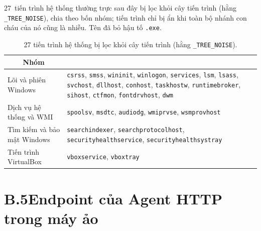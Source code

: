 \documentclass[../DoAn.tex]{subfiles}
\begin{document}
27~tiến trình hệ thống thường trực sau đây bị lọc khỏi cây tiến
trình (hằng \texttt{\_TREE\_NOISE}), chia theo bốn nhóm; tiến trình
chỉ bị ẩn khi toàn bộ nhánh con cháu của nó cũng là nhiễu. Tên đã
bỏ hậu tố \texttt{.exe}.
\begin{table}[H]
\centering
\caption{27 tiến trình hệ thống bị lọc khỏi cây tiến trình
  (hằng \texttt{\_TREE\_NOISE}).}
\label{tab:tree-noise}
\begin{tabular}{|l|>{\raggedright\arraybackslash}p{8.5cm}|}
\hline
\multicolumn{1}{|c|}{\textbf{Nhóm}} & \multicolumn{1}{c|}{\textbf{Tiến trình}} \\
\hline
Lõi và phiên Windows &
  \texttt{csrss}, \texttt{smss}, \texttt{wininit}, \texttt{winlogon},
  \texttt{services}, \texttt{lsm}, \texttt{lsass}, \texttt{svchost},
  \texttt{dllhost}, \texttt{conhost}, \texttt{taskhostw},
  \texttt{runtimebroker}, \texttt{sihost}, \texttt{ctfmon},
  \texttt{fontdrvhost}, \texttt{dwm} \\
\hline
Dịch vụ hệ thống và WMI &
  \texttt{spoolsv}, \texttt{msdtc}, \texttt{audiodg},
  \texttt{wmiprvse}, \texttt{wsmprovhost} \\
\hline
Tìm kiếm và bảo mật Windows &
  \texttt{searchindexer}, \texttt{searchprotocolhost},
  \texttt{securityhealthservice}, \texttt{securityhealthsystray} \\
\hline
Tiến trình VirtualBox &
  \texttt{vboxservice}, \texttt{vboxtray} \\
\hline
\end{tabular}
\end{table}

\section*{B.5\quad Endpoint của Agent HTTP trong máy ảo}
\end{document}
